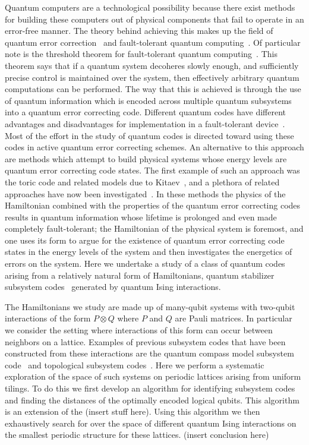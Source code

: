 \documentclass[twocolumn,showpacs,preprintnumbers,amsmath,amssymb,nofootinbib,pra,floatfix]{revtex4-1}
\begin{document}
Quantum computers are a technological possibility because there exist methods for building these computers out of physical components that fail to operate in an error-free manner.  The theory behind achieving this makes up the field of quantum error correction~\cite{Shor:95a,Steane:96a,Steane:96b,Steane:96c,Knill:97a,Gottesman:97a} and fault-tolerant quantum computing~\cite{Shor:96a,Aharonov:97a,Knill:98a,Knill:98b,Preskill:98a,Aliferis:05a}. Of particular note is the threshold theorem for fault-tolerant quantum computing~\cite{Aharonov:97a,Knill:98a,Knill:98b,Aliferis:05a}.  This theorem says that if a quantum system decoheres slowly enough, and sufficiently precise control is maintained over the system, then effectively arbitrary quantum computations can be performed.  The way that this is achieved is through the use of quantum information which is encoded across multiple quantum subsystems into a quantum error correcting code.  Different quantum codes have different advantages and disadvantages for implementation in a fault-tolerant device~\cite{Cross:07a}.  Most of the effort in the study of quantum codes is directed toward using these codes in active quantum error correcting schemes.  An alternative to this approach are methods which attempt to build physical systems whose energy levels are quantum error correcting code states.  The first example of such an approach was the toric code and related models due to Kitaev~\cite{Kitaev:97c,Kitaev:03a}, and a plethora of related approaches have now been investigated~\cite{Barnes:00a,Bacon:01b,Jordan:05a,Weinstein:05b,Bacon:06a,Bacon:08b,Nayak:08a,Bombin:09a,Chesi:10a}. In these methods the physics of the Hamiltonian combined with the properties of the quantum error correcting codes results in quantum information whose lifetime is prolonged and even made completely fault-tolerant; the Hamiltonian of the physical system is foremost, and one uses its form to argue for the existence of quantum error correcting code states in the energy levels of the system and then investigates the energetics of errors on the system.  Here we undertake a study of a class of quantum codes arising from a relatively natural form of Hamiltonians, quantum stabilizer subsystem codes~\cite{Poulin:05a,Kribs:05a,Kribs:05b,Kribs:06a} generated by quantum Ising interactions.

The Hamiltonians we study are made up of many-qubit systems with two-qubit interactions of the form $P \otimes Q$ where $P$ and $Q$ are Pauli matrices.  In particular we consider the setting where interactions of this form can occur between neighbors on a lattice.  Examples of previous subsystem codes that have been constructed from these interactions are the quantum compass model subsystem code~\cite{Bacon:06a} and topological subsystem codes~\cite{Bombin:10a}.  Here we perform a systematic exploration of the space of such systems on periodic lattices arising from uniform tilings.  To do this we first develop an algorithm for identifying subsystem codes and finding the distances of the optimally encoded logical qubits.  This algorithm is an extension of the (insert stuff here).  Using this algorithm we then exhaustively search for over the space of different quantum Ising interactions on the smallest periodic structure for these lattices.   (insert conclusion here)
\end{document}
